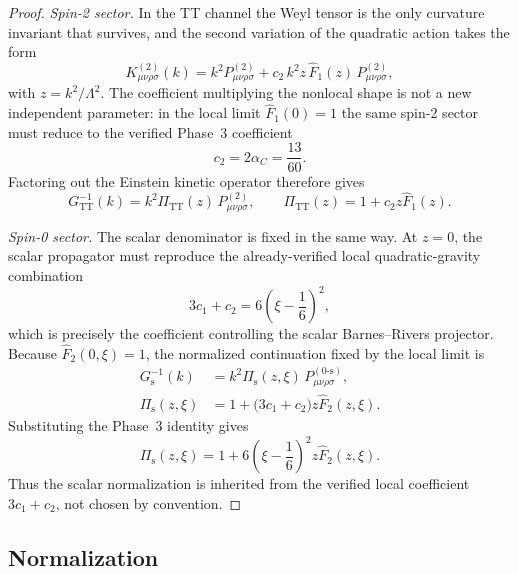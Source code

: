\documentclass[11pt,a4paper]{article}
\theoremstyle{plain}
\theoremstyle{definition}
\begin{document}
\begin{proof}
\emph{Spin-2 sector.} In the TT channel the Weyl tensor is the only
curvature invariant that survives, and the second variation of the
quadratic action takes the form
\begin{equation}
  K^{(2)}_{\mu\nu\rho\sigma}(k)
  = k^2 P^{(2)}_{\mu\nu\rho\sigma}
  + c_2\, k^2 z\, \hat{F}_1(z)\, P^{(2)}_{\mu\nu\rho\sigma},
\end{equation}
with $z = k^2/\Lambda^2$. The coefficient multiplying the nonlocal
shape is not a new independent parameter: in the local limit
$\hat{F}_1(0)=1$ the same spin-2 sector must reduce to the verified
Phase~3 coefficient
\begin{equation}
  c_2 = 2\alpha_C = \frac{13}{60}.
\end{equation}
Factoring out the Einstein kinetic operator therefore gives
\begin{equation}
  G^{-1}_{\mathrm{TT}}(k)
  = k^2 \Pi_{\mathrm{TT}}(z)\, P^{(2)}_{\mu\nu\rho\sigma},
  \qquad
  \Pi_{\mathrm{TT}}(z) = 1 + c_2 z \hat{F}_1(z).
\end{equation}

\emph{Spin-0 sector.} The scalar denominator is fixed in the same way.
At $z=0$, the scalar propagator must reproduce the already-verified local
quadratic-gravity combination
\begin{equation}
  3c_1 + c_2 = 6\left(\xi - \frac{1}{6}\right)^2,
\end{equation}
which is precisely the coefficient controlling the scalar
Barnes--Rivers projector. Because $\hat{F}_2(0,\xi)=1$, the
normalized continuation fixed by the local limit is
\begin{equation}
  \begin{aligned}
    G^{-1}_{\mathrm{s}}(k)
    &= k^2 \Pi_{\mathrm{s}}(z,\xi)\,
       P^{(0\text{-s})}_{\mu\nu\rho\sigma}, \\
    \Pi_{\mathrm{s}}(z,\xi)
    &= 1 + \bigl(3c_1 + c_2\bigr) z \hat{F}_2(z,\xi).
  \end{aligned}
\end{equation}
Substituting the Phase~3 identity gives
\begin{equation}
  \Pi_{\mathrm{s}}(z,\xi)
  = 1 + 6\left(\xi - \frac{1}{6}\right)^2 z \hat{F}_2(z,\xi).
\end{equation}
Thus the scalar normalization is inherited from the verified local
coefficient $3c_1 + c_2$, not chosen by convention.
\end{proof}

\subsection{Normalization}
\end{document}
